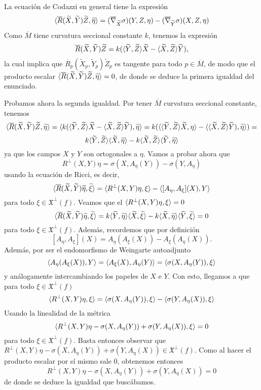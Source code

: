 \documentclass[twoside]{article}
\begin{document}
\begin{solucion}
 La ecuación de Codazzi en general tiene la expresión 
 \[
\langle{\overline{R}(\widetilde{X},\widetilde{Y})\widetilde{Z},\widetilde{\eta}}\rangle=(\overline{\nabla}_{\widetilde{X}}\sigma)(Y,Z,\eta)-(\overline{\nabla}_{\widetilde{Y}}\sigma)(X,Z,\eta)
\]
Como $\overline{M}$ tiene curvatura seccional constante $k$, tenemos la expresión 
\[
\overline{R}(\widetilde{X}, \widetilde{Y} )\widetilde{Z} = k(\langle{\widetilde{Y},\widetilde{Z}}\rangle\widetilde{X} - \langle{\widetilde{X},\widetilde{Z}}\rangle\widetilde{Y} ),
\]
la cual implica que $\overline{R}_p(\widetilde{X}_p, \widetilde{Y}_p )\widetilde{Z}_p$ es tangente para todo $p\in\overline{M}$, de modo que el producto escalar $\langle{\overline{R}(\widetilde{X},\widetilde{Y})\widetilde{Z},\widetilde{\eta}}\rangle=0$, de donde se deduce la primera igualdad del enunciado. 

Probamos ahora la segunda igualdad. Por tener $\overline{M}$ curvatura seccional constante, tenemos
\[
\langle{\overline{R}(\widetilde{X},\widetilde{Y})\widetilde{Z},\widetilde{\eta}}\rangle=\langle{k(\langle{\widetilde{Y},\widetilde{Z}}\rangle\widetilde{X} - \langle{\widetilde{X},\widetilde{Z}}\rangle\widetilde{Y} ),\widetilde{\eta}}\rangle=k(\langle{\langle{\widetilde{Y},\widetilde{Z}}\rangle\widetilde{X},\eta}\rangle - \langle{\langle{\widetilde{X},\widetilde{Z}}\rangle\widetilde{Y} ),\widetilde{\eta}}\rangle)=
\]
\[
k\langle{\widetilde{Y},\widetilde{Z}}\rangle\langle{\widetilde{X},\widetilde{\eta}}\rangle-k\langle{\widetilde{X},\widetilde{Z}}\rangle\langle{\widetilde{Y},\widetilde{\eta}}\rangle
\]
ya que los campos $X$ y $Y$ son ortogonales a $\eta$. Vamos a probar ahora que
\[
R^\perp(X,Y)\eta=\sigma(X,A_\eta(Y))-\sigma(Y,A_\eta)
\]
usando la ecuación de Ricci, es decir, 
\[
\langle{\overline{R}(\widetilde{X},\widetilde{Y})\widetilde{\eta},\widetilde{\xi}}\rangle=\langle{R^\perp(X,Y)\eta,\xi}\rangle-\langle{[A_\eta,A_\xi](X),Y}\rangle
\]
para todo $\xi\in\mathfrak{X}^\perp(f)$. Veamos que el $\langle{R^\perp(X,Y)\eta,\xi}\rangle=0$
\[
\langle{\overline{R}(\widetilde{X},\widetilde{Y})\widetilde{\eta},\widetilde{\xi}}\rangle=k\langle{\widetilde{Y},\widetilde{\eta}}\rangle\langle{\widetilde{X},\widetilde{\xi}}\rangle-k\langle{\widetilde{X},\widetilde{\eta}}\rangle\langle{\widetilde{Y},\widetilde{\xi}}\rangle=0
\]
para todo $\xi\in\mathfrak{X}^\perp(f)$. Además, recordemos que por definición 
\[
[A_\eta,A_\xi](X)=A_\eta(A_\xi(X))-A_\xi(A_\eta(X)).
\]
Además, por ser el endomorfismo de Weingarte autoadjunto
\[
\langle{A_\eta(A_\xi(X)),Y}\rangle=\langle{A_\xi(X),A_\eta(Y)}\rangle=\langle{\sigma(X,A_\eta(Y)),\xi}\rangle
\]
y análogamente intercambiando los papeles de $X$ e $Y$. Con esto, llegamos a que para todo $\xi\in\mathfrak{X}^\perp(f)$
\[
\langle{R^\perp(X,Y)\eta,\xi}\rangle=\langle{\sigma(X,A_\eta(Y)),\xi}\rangle-\langle{\sigma(Y,A_\eta(X)),\xi}\rangle
\]
Usando la linealidad de la métrica 
\[
\langle{R^\perp(X,Y)\eta-\sigma(X,A_\eta(Y))+\sigma(Y,A_\eta(X)),\xi}\rangle=0
\]
para todo $\xi\in\mathfrak{X}^\perp(f)$. Basta entonces observar que $R^\perp(X,Y)\eta-\sigma(X,A_\eta(Y))+\sigma(Y,A_\eta(X))\in\mathfrak{X}^\perp(f)$. Como al hacer el producto escalar por sí mismo sale 0, obtenemos entonces 
\[
R^\perp(X,Y)\eta-\sigma(X,A_\eta(Y))+\sigma(Y,A_\eta(X))=0
\]
de donde se deduce la igualdad que buscábamos. 

\end{solucion}
\end{document}
